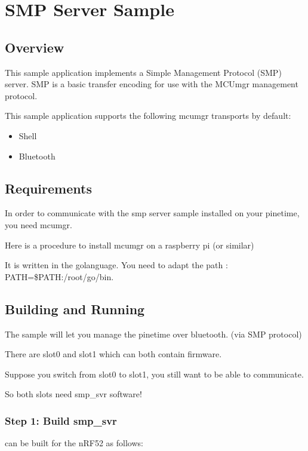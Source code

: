 \documentclass[letterpaper,10pt,english]{sphinxmanual}
\begin{document}
\section{SMP Server Sample}
\label{\detokenize{fota/smp_svr:smp-server-sample}}\label{\detokenize{fota/smp_svr:smp-svr-sample}}\label{\detokenize{fota/smp_svr::doc}}

\subsection{Overview}
\label{\detokenize{fota/smp_svr:overview}}
This sample application implements a Simple Management Protocol (SMP) server.
SMP is a basic transfer encoding for use with the MCUmgr management protocol.

This sample application supports the following mcumgr transports by default:
\begin{itemize}
\item {} 
Shell

\item {} 
Bluetooth

\end{itemize}


\subsection{Requirements}
\label{\detokenize{fota/smp_svr:requirements}}
In order to communicate with the smp server sample installed on your pinetime, you need mcumgr.

Here is a procedure to install mcumgr on a raspberry pi  (or similar)

It is written in the go\sphinxhyphen{}language. You need to adapt the path :   PATH=\$PATH:/root/go/bin.


\subsection{Building and Running}
\label{\detokenize{fota/smp_svr:building-and-running}}
The sample will let you manage the pinetime over bluetooth. (via SMP protocol)

There are slot0 and slot1 which can both contain firmware.

Suppose you switch from slot0 to slot1, you still want to be able to communicate.

So both slots need smp\_svr software!


\subsubsection{Step 1: Build smp\_svr}
\label{\detokenize{fota/smp_svr:step-1-build-smp-svr}}
 can be built for the nRF52 as follows:
\end{document}
